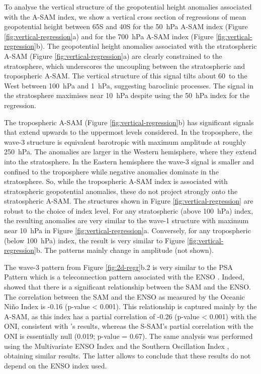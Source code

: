 \documentclass[smallextended]{svjour3}       %
\begin{document}
To analyse the vertical structure of the geopotential height anomalies associated with the A\nobreakdash-SAM index, we show a vertical cross section of regressions of mean geopotential height between 65\degree S and 40\degree S for the 50~hPa A\nobreakdash-SAM index (Figure \ref{fig:vertical-regression}a) and for the 700~hPa A\nobreakdash-SAM index (Figure \ref{fig:vertical-regression}b). The geopotential height anomalies associated with the stratospheric A\nobreakdash-SAM (Figure \ref{fig:vertical-regression}a) are clearly constrained to the stratosphere, which underscores the uncoupling between the stratospheric and tropospheric A\nobreakdash-SAM. The vertical structure of this signal tilts about 60\degree~to the West between 100~hPa and 1~hPa, suggesting baroclinic processes. The signal in the stratosphere maximises near 10~hPa despite using the 50~hPa index for the regression.

The tropospheric A\nobreakdash-SAM (Figure \ref{fig:vertical-regression}b) has significant signals that extend upwards to the uppermost levels considered. In the troposphere, the wave-3 structure is equivalent barotropic with maximum amplitude at roughly 250~hPa. The anomalies are larger in the Western hemisphere, where they extend into the stratosphere. In the Eastern hemisphere the wave-3 signal is smaller and confined to the troposphere while negative anomalies dominate in the stratosphere. So, while the tropospheric A\nobreakdash-SAM index is associated with stratospheric geopotential anomalies, these do not project strongly onto the stratospheric A\nobreakdash-SAM. The structures shown in Figure \ref{fig:vertical-regression} are robust to the choice of index level. For any stratospheric (above 100~hPa) index, the resulting anomalies are very similar to the wave-1 structure with maximum near 10~hPa in Figure \ref{fig:vertical-regression}a. Conversely, for any tropospheric (below 100~hPa) index, the result is very similar to Figure \ref{fig:vertical-regression}b. The patterns mainly change in amplitude (not shown).

The wave-3 pattern from Figure \ref{fig:2d-regr}b.2 is very similar to the PSA Pattern \citep{mo1987, kidson1988} which is a teleconnection pattern associated with the ENSO \citep{karoly1989}. Indeed, \citet{fogt2011} showed that there is a significant relationship between the SAM and the ENSO. The correlation between the SAM and the ENSO as measured by the Oceanic Niño Index \citep[ONI,][]{bamston1997} is -0.16 (p-value \textless{} 0.001). This relationship is captured mainly by the A\nobreakdash-SAM, as this index has a partial correlation of -0.26 (p-value \textless{} 0.001) with the ONI, consistent with \citet{fan2007}'s results, whereas the S\nobreakdash-SAM's partial correlation with the ONI is essentially null (0.019; p-value = 0.67). The same analysis was performed using the Multivariate ENSO Index \citep{wolter2011} and the Southern Oscillation Index \citep{ropelewski1987}, obtaining similar results. The latter allows to conclude that these results do not depend on the ENSO index used.
\end{document}
